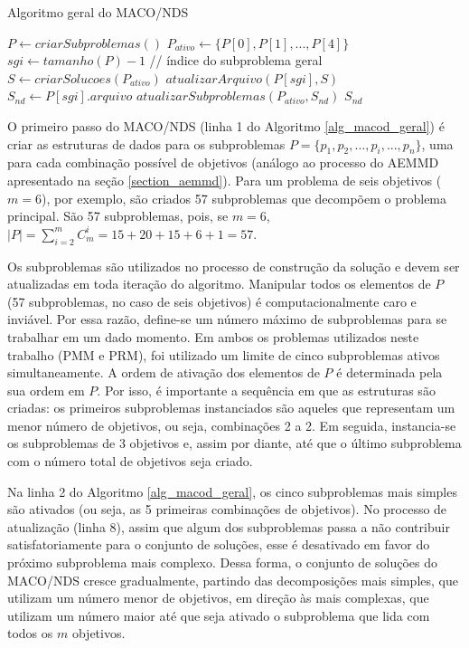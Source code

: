 \begin{algorithm}[!htbp]
	\caption{Algoritmo geral do MACO/NDS}
	\label{alg_macod_geral}
	\begin{algorithmic}[1]
		\State $P \gets criarSubproblemas()$
		\State $P_{ativo} \gets \{P[0], P[1], ..., P[4]\}$
		\State $sgi \gets tamanho(P) - 1$ // índice do subproblema geral
		\State $S \gets criarSolucoes(P_{ativo})$
		\State $atualizarArquivo(P[sgi], S)$
		\State $S_{nd} \gets P[sgi].arquivo$
		\State $atualizarSubproblemas(P_{ativo}, S_{nd})$
		\EndWhile
		\State \Return $S_{nd}$
	\end{algorithmic}
\end{algorithm}

O primeiro passo do MACO/NDS (linha 1 do Algoritmo \ref{alg_macod_geral}) é criar as estruturas de dados para os subproblemas $P = \{p_1, p_2, ..., p_i, ..., p_n\}$, uma para cada combinação possível de objetivos (análogo ao processo do AEMMD apresentado na seção \ref{section_aemmd}). Para um problema de seis objetivos ($m = 6$), por exemplo, são criados 57 subproblemas que decompõem o problema principal. São 57 subproblemas, pois, se $m = 6$, $|P| = \sum_{i = 2}^m C_m^i = 15 + 20 + 15 + 6 + 1 = 57$.

Os subproblemas são utilizados no processo de construção da solução e devem ser atualizadas em toda iteração do algoritmo. Manipular todos os elementos de $P$ (57 subproblemas, no caso de seis objetivos) é computacionalmente caro e inviável. Por essa razão, define-se um número máximo de subproblemas para se trabalhar em um dado momento. Em ambos os problemas utilizados neste trabalho (PMM e PRM), foi utilizado um limite de cinco subproblemas ativos simultaneamente. A ordem de ativação dos elementos de $P$ é determinada pela sua ordem em $P$. Por isso, é importante a sequência em que as estruturas são criadas: os primeiros subproblemas instanciados são aqueles que representam um menor número de  objetivos, ou seja, combinações 2 a 2. Em seguida, instancia-se os subproblemas de 3 objetivos e, assim por diante, até que o último subproblema com o número total de objetivos seja criado.

Na linha 2 do Algoritmo \ref{alg_macod_geral}, os cinco subproblemas mais simples são ativados (ou seja, as 5 primeiras combinações de objetivos). No processo de atualização (linha 8), assim que algum dos subproblemas passa a não contribuir satisfatoriamente para o conjunto de soluções, esse é desativado em favor do próximo subproblema mais complexo. Dessa forma, o conjunto de soluções do MACO/NDS cresce gradualmente, partindo das decomposições mais simples, que utilizam um número menor de objetivos, em direção às mais complexas, que utilizam um número maior até que seja ativado o subproblema que lida com todos os $m$ objetivos.

